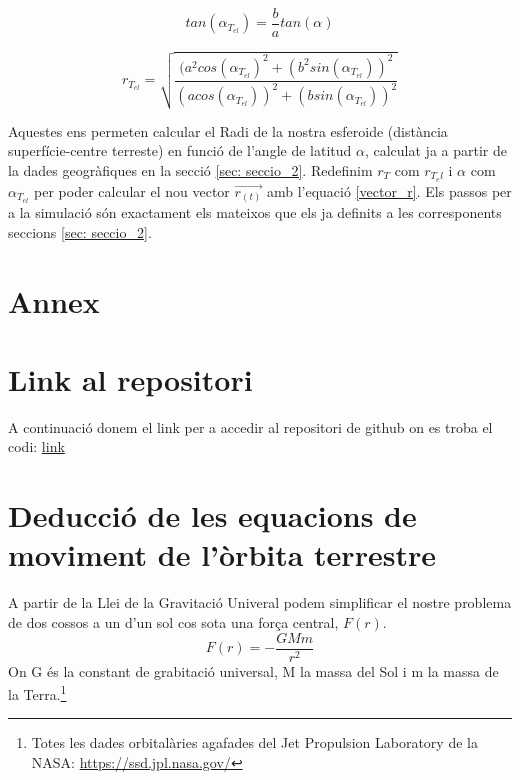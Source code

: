 \documentclass[11pt]{article}
\begin{document}
\begin{equation}
    tan(\alpha_{T_{el}}) = \frac{b}{a}tan(\alpha) 
    \label{eq: alphatel}
\end{equation}

\begin{equation}
    r_{T_{el}} = \sqrt{\frac{(a^2cos(\alpha_{T_{el}})^2+(b^2sin(\alpha_{T_{el}}))^2}{(acos(\alpha_{T_{el}}))^2+(bsin(\alpha_{T_{el}}))^2}}
    \label{eq: rtel}
\end{equation}

Aquestes ens permeten calcular el Radi de la nostra esferoide (distància superfície-centre terreste) en funció de l'angle de latitud $\alpha$, calculat ja a partir de la dades geogràfiques en la secció \ref{sec: seccio_2}. Redefinim $r_T$ com $r_{T_el}$ i $\alpha$ com $\alpha_{T_{el}}$ per poder calcular el nou vector $\vec{r_{(t)}}$ amb l'equació \eqref{vector_r}. Els passos per a la simulació són exactament els mateixos que els ja definits a les corresponents seccions \ref{sec: seccio_2}.

\section*{Annex}
\appendix

\section{Link al repositori}
\vspace{-1em}
A continuació donem el link per a accedir al repositori de github on es troba el codi: \href{https://github.com/isaacbg25/Sol/tree/main}{link}


\section{Deducció de les equacions de moviment de l'òrbita terrestre}
\label{annex: equ_mov}
A partir de la Llei de la Gravitació Univeral podem simplificar el nostre problema de dos cossos a un d'un sol cos sota una força central, $F(r)$.
\begin{equation}
    F(r)=-\frac{GMm}{r^2}
\end{equation}
On G és la constant de grabitació universal, M la massa del Sol i m la massa de la Terra.\footnote{Totes les dades orbitalàries agafades del Jet Propulsion Laboratory de la NASA: \url{https://ssd.jpl.nasa.gov/}}
\end{document}
